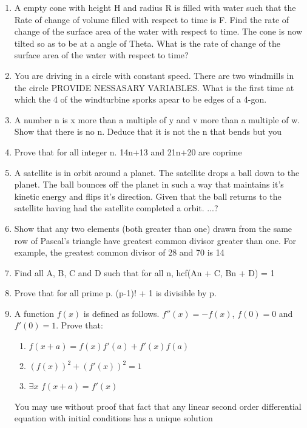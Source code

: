 \documentclass[a4paper]{article}
\begin{document}
\begin{enumerate}
\item
A empty cone with height H and radius R is filled with water such that the
 Rate of change of volume filled with respect to time is F. Find the rate of change of the surface area of the water with respect to time. The cone is now tilted so as to be at a angle of Theta. What is the rate of change of the surface area of the water with respect to time?

\item
You are driving in a circle with constant speed. There are two windmills in the circle PROVIDE NESSASARY VARIABLES. What is the first time at which the 4 of the windturbine sporks apear to be edges of a 4-gon.

\item
A number n is x more than a multiple of y and v more than a multiple of w. Show that there is no n. Deduce that it is not the n that bends but you

\item
Prove that for all integer n. 14n+13 and 21n+20 are coprime

\item
A satellite is in orbit around a planet. The satellite drops a ball down to the planet. The ball bounces off the planet in such a way that maintains it’s kinetic energy and flips it’s direction. Given that the ball returns to the satellite having had the satellite completed a orbit. ...?

\item
Show that any two elements (both greater than one) drawn from the same row of Pascal's triangle have greatest common divisor greater than one.  For example, the greatest common divisor of 28 and 70 is 14

\item
Find all A, B, C and D such that for all n, hcf(An + C, Bn + D) = 1

\item
Prove that for all prime p. (p-1)! + 1 is divisible by p.

\item
A function $f(x)$ is defined as follows. $f''(x) = -f(x)$, $f(0) = 0$ and $f'(0) = 1$. Prove that:
\begin{enumerate}
    \item $f(x + a) = f(x)f'(a) + f'(x)f(a)$
    \item $(f(x))^2 + (f'(x))^2 = 1$
    \item $\exists x$ $f(x+a) = f'(x)$
\end{enumerate}
You may use without proof that fact that any linear second order differential equation with initial conditions has a unique solution


\end{enumerate}
\end{document}
